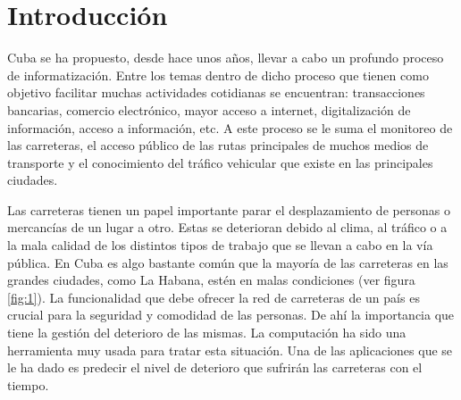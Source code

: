 \chapter*{Introducción}\label{chapter:introduction}

Cuba se ha propuesto, desde hace unos años, llevar a cabo un profundo proceso de informatización.
Entre los temas dentro de dicho proceso que tienen como objetivo facilitar muchas actividades
cotidianas se encuentran: transacciones bancarias, comercio electrónico, mayor acceso a internet, digitalización
de información, acceso a información, etc. A este proceso se le suma el monitoreo de las carreteras, 
el acceso público de las rutas principales de muchos medios de transporte y el conocimiento del tráfico vehicular
que existe en las principales ciudades.

Las carreteras tienen un papel importante parar el desplazamiento 
de personas o mercancías de un lugar a otro. Estas se deterioran debido al clima, al tráfico o a la mala calidad de 
los distintos tipos de trabajo que se llevan a cabo en la vía pública. En Cuba es algo bastante común que la mayoría de 
las carreteras en las grandes ciudades, como La Habana, estén en malas condiciones (ver figura \ref{fig:1}). 
La funcionalidad que debe ofrecer la red de carreteras de un país es crucial para la seguridad y comodidad de las personas. 
De ahí la importancia que tiene la gestión del deterioro de las mismas. La computación ha sido una herramienta muy usada 
para tratar esta situación. Una de las aplicaciones que se le ha dado es predecir el nivel de deterioro que sufrirán 
las carreteras con el tiempo.  


